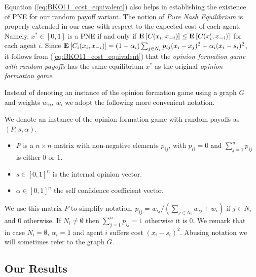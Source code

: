 Equation (\ref{eq:BKO11_cost_equivalent}) also helps in establishing the existence of PNE for 
our random payoff variant. The notion of \emph{Pure Nash Equilibrium} is properly
 extended in our case with respect to the expected cost of each agent. Namely, 
$x^* \in [0,1]$ is a PNE if and only if $\Exp{C(x_i, x_{-i})} \leq \Exp{C(x_i', x_{-i})}$ 
for each agent $i$. Since $\bm{\mathrm{E}}_{} \left[ C_i(x_i,x_{-i}) \right]=(1-\alpha_i)\sum_{j \in N_i}p_{ij}(x_i-x_j)^2 + \alpha_i(x_i-s_i)^2$, 
it follows from (\ref{eq:BKO11_cost_equivalent}) that the 
\emph{opinion formation game with random payoffs} has the same equilibrium $x^*$ as 
the original \emph{opinion formation game}.

Instead of denoting an instance of the opinion formation game using a graph $G$
and weights $w_{ij}$, $w_i$ we adopt the following more convenient notation.

\begin{definition}\label{d:random_payof_game_instance}
We denote an instance of the opinion formation game with random payoffs as $(P,s,\alpha)$.
\begin{itemize}
 \item $P$ is a $n \times n$  matrix with non-negative elements $p_{ij}$,
  with $p_{ii}=0$ and $\sum_{j=1}^n p_{ij}$ is either $0$ or $1$.
 \item $s \in [0,1]^n$ is the internal opinion vector.
 \item $\alpha \in [0,1]^n$ the self confidence coefficient vector.
 \end{itemize}
\end{definition}
We use this matrix $P$ to simplify notation, $p_{ij} = w_{ij}/(\sum_{j \in N_i}w_{ij}+w_i)$ if $j \in N_i$ and $0$ otherwise.
If $N_i \neq \emptyset$ then $\sum_{j=1}^n p_{ij}=1$ otherwise it is $0$. We remark that in case $N_i=\emptyset$, $\alpha_i=1$
and agent $i$ suffers cost $(x_i-s_i)^2$.
Abusing notation we will sometimes refer to the graph $G$.


\subsection{Our Results}

